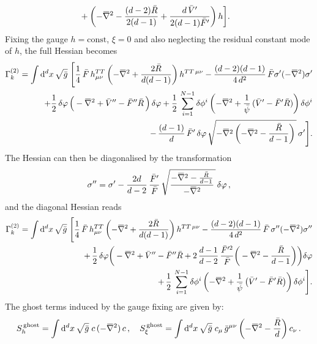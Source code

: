 \documentclass[11pt]{book} %
\newcommand{\overbar}[1]{\mkern 1.5mu\overline{\mkern-1.5mu#1\mkern-1.5mu}\mkern 1.5mu}
\newcommand{\bnabla}{\overbar \nabla}
\newcommand{\rad}{\psi}
\numberwithin{equation}{chapter}
\begin{document}
{\begin{appendices}
\begin{align}
    &+
    \left(
      -\bnabla^2
      -\frac{(d-2) \bar{R}}{2(d-1)}
      +\frac{d\,\bar{V}^{\prime}}{2(d-1)\bar{F}^{\prime}}
    \right)
    h
  \bigg] .
\end{align}
Fixing the gauge $h = \text{const}$, $\xi=0$ and also neglecting the residual constant mode of $h$,
the full Hessian becomes
\begin{align}
  \Gamma_k^{(2)} = \int \mathrm d^d x \, \sqrt{\bar{g}} \;
  \Bigg[
    \frac{1}{4} \, \bar{F} \, h^{TT}_{\mu\nu} \left( -\bnabla^2 + \frac{2 \bar{R}}{d(d-1)} \right) h^{TT\,\mu\nu}
    - \frac{(d-2)(d-1)}{4\,d^2} \, \bar{F} \sigma^{\prime} (-\bnabla^2) \sigma^{\prime}
    \nonumber\\
    +\frac{1}{2} \, \delta\varphi \, \Big( -\bnabla^2 + \bar V'' - \bar F''\bar{R} \, \Big) \, \delta\varphi
    +\frac{1}{2} \, \sum_{i=1}^{N-1} \delta\phi^i
    \left(-\bnabla^2
    +\frac{1}{\bar\rad} \, (\bar V'-\bar F'\bar{R})\right) \delta\phi^i
    \nonumber \\
    - \,   \frac{(d-1)}{d} \, \bar{F}^{\prime} \, \delta\varphi \,
    \sqrt{-\bnabla^2\left(-\bnabla^2-\frac{\bar{R}}{d-1}\right) \, } \, \sigma^{\prime}
  \Bigg] .
  \label{oldHessian}
\end{align}
The Hessian can then be diagonalised by the transformation
\begin{align}
  \sigma^{\prime\prime} = \sigma^{\prime}
  -\frac{2d}{d-2} \, \frac{\bar{F}^{\prime}}{\bar{F}}  \, \sqrt{\frac{-\bnabla^2-\frac{\bar{R}}{d-1}}{-\bnabla^2} \, } \, \delta\varphi\,,
\end{align}
and the diagonal Hessian reads
\begin{align}
  \Gamma_k^{(2)} = \int \mathrm{d}^d x \, \sqrt{\bar{g}} \;
  \Bigg[
    \frac{1}{4}\,\bar{F}\, h^{TT}_{\mu\nu} \left( -\bnabla^2
    + \frac{2 \bar{R}}{d(d-1)} \right) h^{TT\,\mu\nu}
    - \frac{(d-2)(d-1)}{4\,d^2} \, \bar{F} \, \sigma^{\prime\prime} (-\bnabla^2) \sigma^{\prime\prime}
    \nonumber\\
    +\, \frac{1}{2} \, \delta\varphi
    \bigg(
      - \bnabla^2 + \bar V'' - \bar F'' \bar R
      + 2 \, \frac{d-1}{d-2} \, \frac{\bar{F}^{\prime 2}}{\bar{F}}
      \bigg(
        -\bnabla^2 - \frac{\bar{R}}{d-1}
      \bigg)
    \bigg) \delta\varphi \nonumber \\
    +\,\frac{1}{2} \, \sum_{i=1}^{N-1} \delta\phi^i
    \left( -\bnabla^2
    +\frac{1}{\bar\rad} \, \big( \bar V'-\bar F'\bar{R} \big)\right)\delta\phi^i
  \Bigg] .
  \label{hessfinal}
\end{align}
The ghost terms induced by the gauge fixing are given by:
\begin{align}
  S^{\,\mathrm{ghost}}_{h} = \int \mathrm d^dx \, \sqrt{\bar g} \; c \, (-\bnabla^2) \, c \,,
  \quad
  S^{\,\mathrm{ghost}}_{\xi} = \int \mathrm d^dx \, \sqrt{\bar g} \;  c_\mu \, \bar g^{\mu\nu}
  \left(-\bnabla^2-\frac{\bar R}{d}\right) c_\nu \,.
  \label{ghosts}
\end{align}



\end{appendices}}
\end{document}
